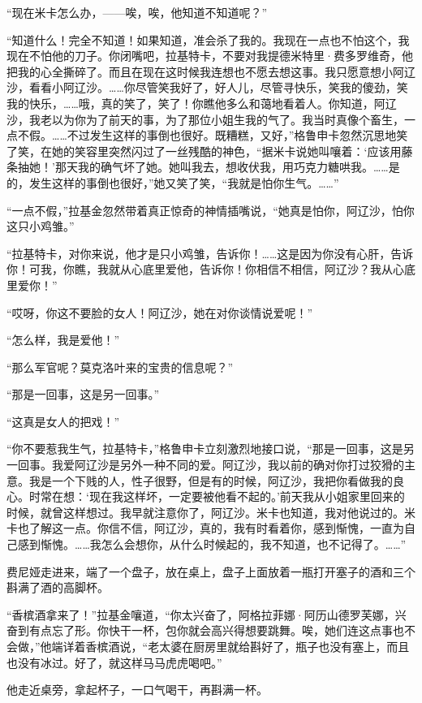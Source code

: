 \par “现在米卡怎么办，——唉，唉，他知道不知道呢？”
\par “知道什么！完全不知道！如果知道，准会杀了我的。我现在一点也不怕这个，我现在不怕他的刀子。你闭嘴吧，拉基特卡，不要对我提德米特里·费多罗维奇，他把我的心全撕碎了。而且在现在这时候我连想也不愿去想这事。我只愿意想小阿辽沙，看看小阿辽沙。……你尽管笑我好了，好人儿，尽管寻快乐，笑我的傻劲，笑我的快乐，……哦，真的笑了，笑了！你瞧他多么和蔼地看着人。你知道，阿辽沙，我老以为你为了前天的事，为了那位小姐生我的气了。我当时真像个畜生，一点不假。……不过发生这样的事倒也很好。既糟糕，又好，”格鲁申卡忽然沉思地笑了笑，在她的笑容里突然闪过了一丝残酷的神色，“据米卡说她叫嚷着：‘应该用藤条抽她！’那天我的确气坏了她。她叫我去，想收伏我，用巧克力糖哄我。……是的，发生这样的事倒也很好，”她又笑了笑，“我就是怕你生气。……”
\par “一点不假，”拉基金忽然带着真正惊奇的神情插嘴说，“她真是怕你，阿辽沙，怕你这只小鸡雏。”
\par “拉基特卡，对你来说，他才是只小鸡雏，告诉你！……这是因为你没有心肝，告诉你！可我，你瞧，我就从心底里爱他，告诉你！你相信不相信，阿辽沙？我从心底里爱你！”
\par “哎呀，你这不要脸的女人！阿辽沙，她在对你谈情说爱呢！”
\par “怎么样，我是爱他！”
\par “那么军官呢？莫克洛叶来的宝贵的信息呢？”
\par “那是一回事，这是另一回事。”
\par “这真是女人的把戏！”
\par “你不要惹我生气，拉基特卡，”格鲁申卡立刻激烈地接口说，“那是一回事，这是另一回事。我爱阿辽沙是另外一种不同的爱。阿辽沙，我以前的确对你打过狡猾的主意。我是一个下贱的人，性子很野，但是有的时候，阿辽沙，我把你看做我的良心。时常在想：‘现在我这样坏，一定要被他看不起的。’前天我从小姐家里回来的时候，就曾这样想过。我早就注意你了，阿辽沙。米卡也知道，我对他说过的。米卡也了解这一点。你信不信，阿辽沙，真的，我有时看着你，感到惭愧，一直为自己感到惭愧。……我怎么会想你，从什么时候起的，我不知道，也不记得了。……”
\par 费尼娅走进来，端了一个盘子，放在桌上，盘子上面放着一瓶打开塞子的酒和三个斟满了酒的高脚杯。
\par “香槟酒拿来了！”拉基金嚷道，“你太兴奋了，阿格拉菲娜·阿历山德罗芙娜，兴奋到有点忘了形。你快干一杯，包你就会高兴得想要跳舞。唉，她们连这点事也不会做，”他端详着香槟酒说，“老太婆在厨房里就给斟好了，瓶子也没有塞上，而且也没有冰过。好了，就这样马马虎虎喝吧。”
\par 他走近桌旁，拿起杯子，一口气喝干，再斟满一杯。
